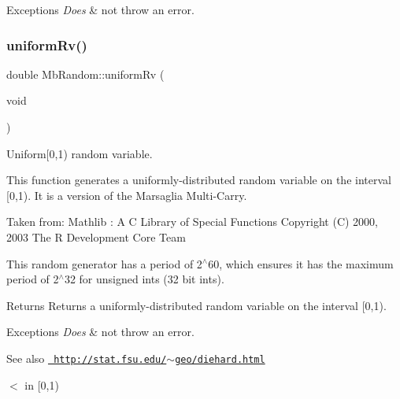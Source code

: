 \begin{DoxyExceptions}{Exceptions}
{\em Does} & not throw an error. \\
\hline
\end{DoxyExceptions}
\mbox{\label{class_mb_random_af7e99ee2ca8a02c2ae163e1c00f528bf}} 
\subsubsection{\texorpdfstring{uniformRv()}{uniformRv()}\hspace{0.1cm}{\footnotesize\ttfamily [1/2]}}
{\footnotesize\ttfamily double Mb\+Random\+::uniform\+Rv (\begin{DoxyParamCaption}\item[{void}]{ }\end{DoxyParamCaption})}



Uniform\mbox{[}0,1) random variable. 

This function generates a uniformly-\/distributed random variable on the interval \mbox{[}0,1). It is a version of the Marsaglia Multi-\/\+Carry.

Taken from\+: Mathlib \+: A C Library of Special Functions Copyright (C) 2000, 2003 The R Development Core Team

This random generator has a period of 2$^\wedge$60, which ensures it has the maximum period of 2$^\wedge$32 for unsigned ints (32 bit ints).

\begin{DoxyReturn}{Returns}
Returns a uniformly-\/distributed random variable on the interval \mbox{[}0,1). 
\end{DoxyReturn}

\begin{DoxyExceptions}{Exceptions}
{\em Does} & not throw an error. \\
\hline
\end{DoxyExceptions}
\begin{DoxySeeAlso}{See also}
\href{http://stat.fsu.edu/~geo/diehard.html}{\texttt{ http\+://stat.\+fsu.\+edu/$\sim$geo/diehard.\+html}} 
\end{DoxySeeAlso}
$<$ in \mbox{[}0,1) \mbox{\label{class_mb_random_a277d841d32f82f756c95b87eb6184ed2}} 
